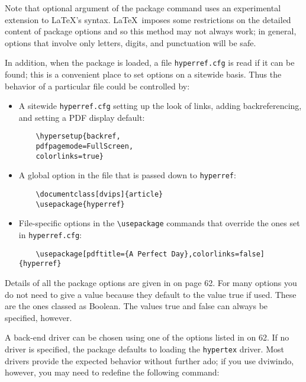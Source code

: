 Note that optional argument of the package command uses an experimental
extension to \LaTeX's syntax. \LaTeX\ imposes some restrictions on the
detailed content of package options and so this method may not always
work; in general, options that involve only letters, digits, and
punctuation will be safe. 

In addition, when the package is loaded, a file \verb|hyperref.cfg| is read if it can 
be found; this is a convenient place to set options on a sitewide basis. Thus the 
behavior of a particular file could be controlled by: 

\begin{itemize}
  \item A sitewide \verb|hyperref.cfg| setting up the look of links, adding backreferencing, 
    and setting a PDF display default: 

    \begin{verbatim}
    \hypersetup{backref, 
    pdfpagemode=FullScreen, 
    colorlinks=true} 
    \end{verbatim}

  \item A global option in the file that is passed down to \verb|hyperref|: 

    \begin{verbatim}
    \documentclass[dvips]{article} 
    \usepackage{hyperref} 
    \end{verbatim}

  \item File-specific options in the \verb|\usepackage| commands that override the ones set 
    in \verb|hyperref.cfg|: 

    \begin{verbatim}
    \usepackage[pdftitle={A Perfect Day},colorlinks=false]{hyperref} 
    \end{verbatim}
\end{itemize}

Details of all the package options are given in  on page 62. For 
many options you do not need to give a value because they default to the value 
true if used. These are the ones classed as Boolean. The values true and false 
can always be specified, however. 


A back-end driver can be chosen using one of the options listed in  on 
 62. If no driver is specified, the package defaults to loading the \verb|hypertex| 
driver. Most drivers provide the expected behavior without further ado; if you use 
dviwindo, however, you may need to redefine the following command: 

